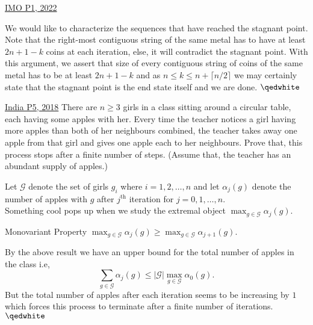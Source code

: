 \begin{problem}{3}{\href{https://artofproblemsolving.com/community/q1h2883211p34203276}{IMO P1, 2022}}
\begin{solution}
	\indent We would like to characterize the sequences that have reached the stagnant point. Note that the right-most contiguous string of the same metal has to have at least $2n+1-k$ coins at each iteration, else, it will contradict the stagnant point. With this argument, we assert that size of every contiguous string of coins of the same metal has to be at least $2n+1-k$ and as $n\le k\le n+\lceil n/2\rceil$ we may certainly state that the stagnant point is the end state itself and we are done. $\qedwhite$
	\end{solution}
\end{problem}
	
\begin{problem}{4}{\href{https://artofproblemsolving.com/community/q1h1578516p32946994}{India P5, 2018}}
	There are $n\ge 3$ girls in a class sitting around a circular table, each having some apples with her. Every time the teacher notices a girl having more apples than both of her neighbours combined, the teacher takes away one apple from that girl and gives one apple each to her neighbours. Prove that, this process stops after a finite number of steps. (Assume that, the teacher has an abundant supply of apples.)
	\begin{solution} Let $\mathcal{G}$ denote the set of girls $g_i$ where $i=1,2,\ldots,n $ and let $\alpha_j(g)$ denote the number of apples with $g$ after $j^{\text{th}}$ iteration for $j=0,1,\ldots,n$.\\
	Something cool pops up when we study the extremal object $\displaystyle\max_{g\in\mathcal{G}}\alpha_j{(g)}$.

	\begin{lemma}{1}{Monovariant Property}
		$\displaystyle\max_{g\in\mathcal{G}}\alpha_{j}{(g)}\ge \displaystyle\max_{g\in\mathcal{G}}\alpha_{j+1}{(g)}$.
	\end{lemma}
	By the above result we have an upper bound for the total number of apples in the class i.e,
$$\sum_{g\in\mathcal{G}}\alpha_{j}(g)\le |\mathcal{G}|\max_{g\in\mathcal{G}}\alpha_{0}{(g)}.$$But the total number of apples after each iteration seems to be increasing by $1$ which forces this process to terminate after a finite number of iterations.$\qedwhite$
	\end{solution}
\end{problem}
